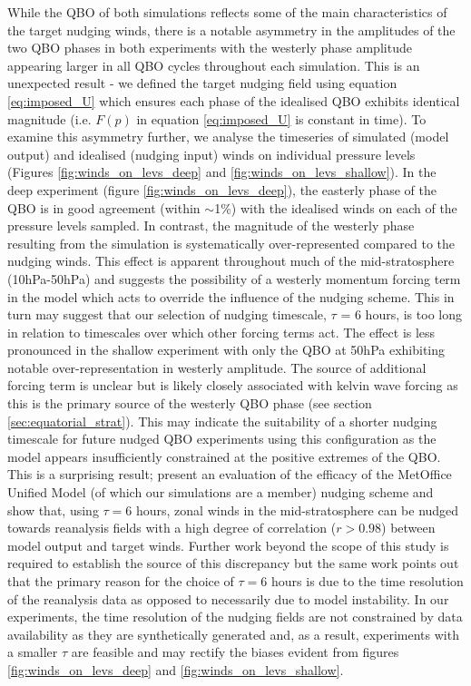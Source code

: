While the QBO of both simulations reflects some of the main characteristics of the target nudging winds, there is a notable asymmetry in the amplitudes of the two QBO phases in both experiments with the westerly phase amplitude appearing larger in all QBO cycles throughout each simulation. This is an unexpected result - we defined the target nudging field using equation \ref{eq:imposed_U} which ensures each phase of the idealised QBO exhibits identical magnitude (i.e. $F(p)$ in equation \ref{eq:imposed_U} is constant in time). To examine this asymmetry further, we analyse the timeseries of simulated (model output) and idealised (nudging input) winds on individual pressure levels (Figures \ref{fig:winds_on_levs_deep} and \ref{fig:winds_on_levs_shallow}). In the deep experiment (figure \ref{fig:winds_on_levs_deep}), the easterly phase of the QBO is in good agreement (within $\sim$1\%) with the idealised winds on each of the pressure levels sampled. In contrast, the magnitude of the westerly phase resulting from the simulation is systematically over-represented compared to the nudging winds. This effect is apparent throughout much of the mid-stratosphere (10hPa-50hPa) and suggests the possibility of a westerly momentum forcing term in the model which acts to override the influence of the nudging scheme. This in turn may suggest that our selection of nudging timescale, $\tau$ = 6 hours, is too long in relation to timescales over which other forcing terms  act. The effect is less pronounced in the shallow experiment with only the QBO at 50hPa exhibiting notable over-representation in westerly amplitude. The source of additional forcing term is unclear but is likely closely associated with kelvin wave forcing as this is the primary source of the westerly QBO phase (see section \ref{sec:equatorial_strat}). This may indicate the suitability of a shorter nudging timescale for future nudged QBO experiments using this configuration as the model appears  insufficiently constrained at the positive extremes of the QBO. This is a surprising result; \cite{telfordTechnical2008} present an evaluation of the efficacy of the MetOffice Unified Model (of which our simulations are a member) nudging scheme and show that, using $\tau = 6$ hours, zonal winds in the mid-stratosphere can be nudged towards reanalysis fields with a high degree of correlation ($r>0.98$) between model output and target winds. Further work beyond the scope of this study is required to establish the source of this discrepancy but the same work points out that the primary reason for the choice of $\tau = 6$ hours is due to the time resolution of the reanalysis data as opposed to necessarily due to model instability. In our experiments, the time resolution of the nudging fields are not constrained by data availability as they are synthetically generated and, as a result, experiments with a smaller $\tau$ are feasible and may rectify the biases evident from figures \ref{fig:winds_on_levs_deep} and \ref{fig:winds_on_levs_shallow}.

